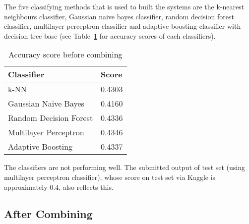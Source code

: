 \documentclass[10pt]{article}
\begin{document}
The five classifying methods that is used to built the systems are the k-nearest neighbours classifier, Gaussian naive bayes classifier, random decision forest classifier, multilayer perceptron classifier and adaptive boosting classifier with decision tree base (see Table~\ref{table1} for accuracy scores of each classifiers).
\begin{table}[ht]
\begin{center}
\begin{tabular}{|l|l|}
      \hline
      Classifier & Score\\
      \hline\hline
      k-NN & 0.4303\\
      Gaussian Naive Bayes & 0.4160\\
      Random Decision Forest & 0.4336\\
      Multilayer Perceptron  & 0.4346\\
      Adaptive Boosting & 0.4337\\
      \hline
\end{tabular}
\caption{Accuracy score before combining}\label{table1}
\end{center}
\end{table}
The classifiers are not performing well. The submitted output of test set (using multilayer perceptron classifier), whose score on test set via Kaggle is approximately 0.4, also reflects this.

\subsection{After Combining}
\end{document}
